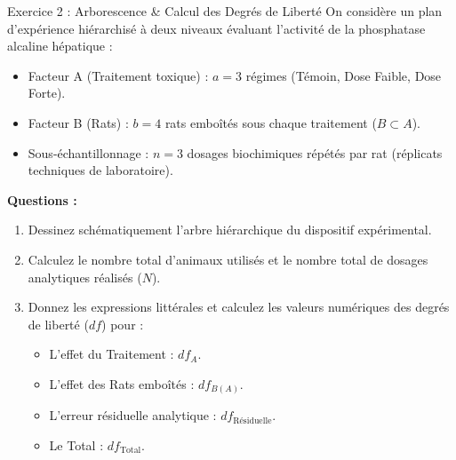 \documentclass[11pt,a4paper]{article}
\begin{document}
\begin{exercicebox}{Exercice 2 : Arborescence \& Calcul des Degrés de Liberté}
On considère un plan d'expérience hiérarchisé à deux niveaux évaluant l'activité de la phosphatase alcaline hépatique :
\begin{itemize}
  \item Facteur A (Traitement toxique) : $a = 3$ régimes (Témoin, Dose Faible, Dose Forte).
  \item Facteur B (Rats) : $b = 4$ rats emboîtés sous chaque traitement ($B \subset A$).
  \item Sous-échantillonnage : $n = 3$ dosages biochimiques répétés par rat (réplicats techniques de laboratoire).
\end{itemize}

\textbf{Questions :}
\begin{enumerate}[label=\textbf{\alph*.}]
  \item Dessinez schématiquement l'arbre hiérarchique du dispositif expérimental.
  \item Calculez le nombre total d'animaux utilisés et le nombre total de dosages analytiques réalisés ($N$).
  \item Donnez les expressions littérales et calculez les valeurs numériques des degrés de liberté ($df$) pour :
  \begin{itemize}
    \item L'effet du Traitement : $df_A$.
    \item L'effet des Rats emboîtés : $df_{B(A)}$.
    \item L'erreur résiduelle analytique : $df_{\text{Résiduelle}}$.
    \item Le Total : $df_{\text{Total}}$.
  \end{itemize}
\end{enumerate}
\end{exercicebox}
\end{document}
